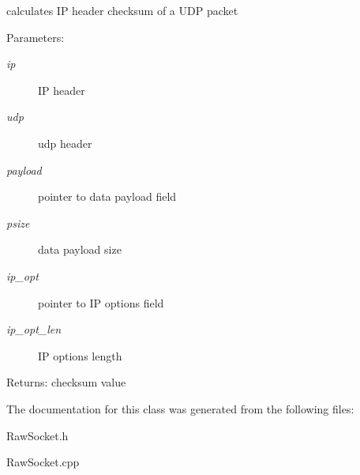 calculates IP header checksum of a UDP packet 

\begin{Desc}
\item[Parameters:]
\begin{description}
\item[{\em ip}]IP header \item[{\em udp}]udp header \item[{\em payload}]pointer to data payload field \item[{\em psize}]data payload size \item[{\em ip\_\-opt}]pointer to IP options field \item[{\em ip\_\-opt\_\-len}]IP options length \end{description}
\end{Desc}
\begin{Desc}
\item[Returns:]checksum value \end{Desc}


The documentation for this class was generated from the following files:\begin{CompactItemize}
\item 
RawSocket.h\item 
RawSocket.cpp\end{CompactItemize}
